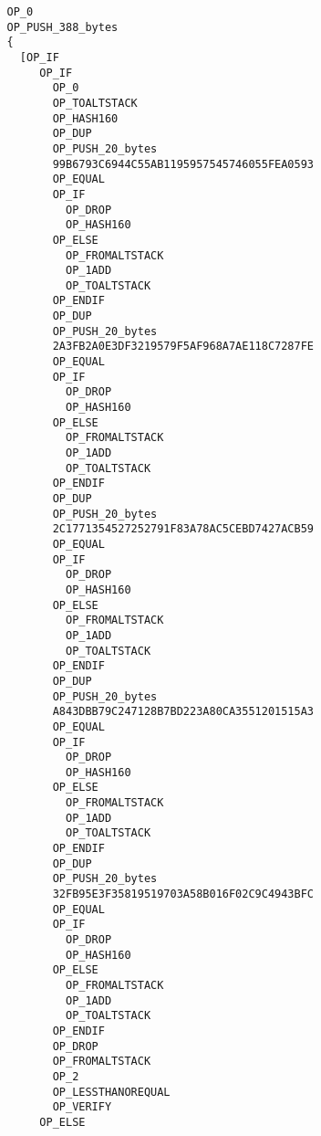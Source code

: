 \begin{lstlisting}
                OP_0
                OP_PUSH_388_bytes
                {
                  [OP_IF
                     OP_IF
                       OP_0
                       OP_TOALTSTACK
                       OP_HASH160
                       OP_DUP
                       OP_PUSH_20_bytes
                       99B6793C6944C55AB1195957545746055FEA0593
                       OP_EQUAL
                       OP_IF
                         OP_DROP
                         OP_HASH160
                       OP_ELSE
                         OP_FROMALTSTACK
                         OP_1ADD
                         OP_TOALTSTACK
                       OP_ENDIF
                       OP_DUP
                       OP_PUSH_20_bytes
                       2A3FB2A0E3DF3219579F5AF968A7AE118C7287FE
                       OP_EQUAL
                       OP_IF
                         OP_DROP
                         OP_HASH160
                       OP_ELSE
                         OP_FROMALTSTACK
                         OP_1ADD
                         OP_TOALTSTACK
                       OP_ENDIF
                       OP_DUP
                       OP_PUSH_20_bytes
                       2C1771354527252791F83A78AC5CEBD7427ACB59
                       OP_EQUAL
                       OP_IF
                         OP_DROP
                         OP_HASH160
                       OP_ELSE
                         OP_FROMALTSTACK
                         OP_1ADD
                         OP_TOALTSTACK
                       OP_ENDIF
                       OP_DUP
                       OP_PUSH_20_bytes
                       A843DBB79C247128B7BD223A80CA3551201515A3
                       OP_EQUAL
                       OP_IF
                         OP_DROP
                         OP_HASH160
                       OP_ELSE
                         OP_FROMALTSTACK
                         OP_1ADD
                         OP_TOALTSTACK
                       OP_ENDIF
                       OP_DUP
                       OP_PUSH_20_bytes
                       32FB95E3F35819519703A58B016F02C9C4943BFC
                       OP_EQUAL
                       OP_IF
                         OP_DROP
                         OP_HASH160
                       OP_ELSE
                         OP_FROMALTSTACK
                         OP_1ADD
                         OP_TOALTSTACK
                       OP_ENDIF
                       OP_DROP
                       OP_FROMALTSTACK
                       OP_2
                       OP_LESSTHANOREQUAL
                       OP_VERIFY
                     OP_ELSE

\end{lstlisting}
